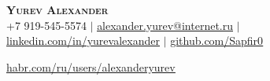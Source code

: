 \documentclass[A4,11pt]{article}
\begin{document}
\begin{comment}
In Europe it is common to include a picture of ones self in the CV. Select
which heading appropriate for the document you are creating.
\end{comment}


\begin{center}
   \textbf{\Huge \scshape Yurev Alexander} \\ \vspace{1pt} %
   \small +7 919-545-5574 $|$ 
   \href{mailto:alexander.yurev@internet.ru}{\underline{alexander.yurev@internet.ru}} $|$\\
   \href{https://linkedin.com/in/yurevalexander}{\underline{linkedin.com/in/yurevalexander}} $|$
   \href{https://github.com/Sapfir0}{\underline{github.com/Sapfir0}}

   \href{https://habr.com/ru/users/alexanderyurev/}{\underline{habr.com/ru/users/alexanderyurev}}
\end{center}



\begin{comment}
This CV was written for specifically for positions I was applying for in
academia, and then modified to be a template.

A standard CV is about two pages long where as a resume in the US is one page.
sections can be added and removed here with this in mind. In my experience, 
education, and applicable work experience and skills are the most import things
to include on a resume. For a CV the Europass CV suggests the categories: Work
Experience, Education and Training, Language Skills, Digital Skills,
Communication and Interpersonal Skills, Conferences and Seminars, Creative Works
Driver's License, Hobbies and Interests, Honors and Awards, Management and
Leadership Skills, Networks and Memberships, Organizational Skills, Projects,
Publications, Recommendations, Social and Political Activities, Volunteering.

Your goal is to convey a who, what , when, where, why for every item you share. 
The who is obviously you, but I believe the rest should be done in that order.
For example below. An employer cares most about the degree held and typically 
less about the institution or where it is located (This is still good 
information though). Whatever order you choose be consistent throughout.
\end{comment}
\end{document}
